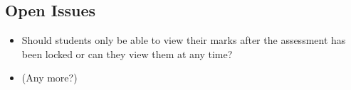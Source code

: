\subsection{Open Issues}
\begin{itemize}
\item Should students only be able to view their marks after the assessment has been locked or can they view them at any time?
\item (Any more?)
\end{itemize}